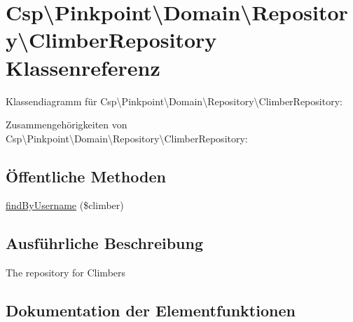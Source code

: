 \hypertarget{classCsp_1_1Pinkpoint_1_1Domain_1_1Repository_1_1ClimberRepository}{}\section{Csp\textbackslash{}Pinkpoint\textbackslash{}Domain\textbackslash{}Repository\textbackslash{}Climber\+Repository Klassenreferenz}
\label{classCsp_1_1Pinkpoint_1_1Domain_1_1Repository_1_1ClimberRepository}


Klassendiagramm für Csp\textbackslash{}Pinkpoint\textbackslash{}Domain\textbackslash{}Repository\textbackslash{}Climber\+Repository\+:


Zusammengehörigkeiten von Csp\textbackslash{}Pinkpoint\textbackslash{}Domain\textbackslash{}Repository\textbackslash{}Climber\+Repository\+:
\subsection*{Öffentliche Methoden}
\begin{DoxyCompactItemize}
\item 
\hyperlink{classCsp_1_1Pinkpoint_1_1Domain_1_1Repository_1_1ClimberRepository_a410ecc0c50e95ec25a68b080925da96d}{find\+By\+Username} (\$climber)
\end{DoxyCompactItemize}


\subsection{Ausführliche Beschreibung}
The repository for Climbers 

\subsection{Dokumentation der Elementfunktionen}
\mbox{\label{classCsp_1_1Pinkpoint_1_1Domain_1_1Repository_1_1ClimberRepository_a410ecc0c50e95ec25a68b080925da96d}} 
